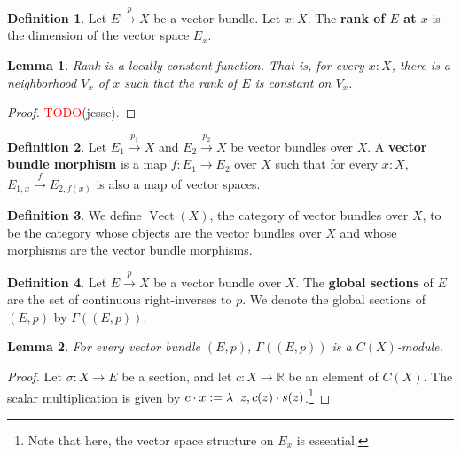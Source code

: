 \documentclass[11pt]{article}
\newcommand{\R}{\mathbb{R}}
\newcommand{\remph}[1]{\textcolor{red}{#1}}
\newcommand{\TODO}{\remph{TODO}}
\newcommand{\Vect}{\operatorname{Vect}}
\theoremstyle{plain}
\newtheorem{lemma}{Lemma}[section]
\theoremstyle{definition}
\newtheorem{definition}{Definition}[section]
\begin{document}
\begin{definition}\label{def:rank}
  Let \(E \overset{p}{\to} X\) be a vector bundle. Let \(x : X\). The \textbf{rank of \(E\) at \(x\)} is the dimension of the vector space \(E_x\).
\end{definition}

\begin{lemma}\label{lemma:rank-locally-constant}
  Rank is a locally constant function. That is, for every \(x : X\), there is a neighborhood \(V_{x}\) of \(x\) such that the rank of \(E\) is constant on \(V_x\).
\end{lemma}

\begin{proof}
  \TODO(jesse).
\end{proof}

\begin{definition} \label{def:vector-bundle-homomorphism}
  Let \(E_1 \overset{p_1}{\to} X\) and \(E_2 \overset{p_2}{\to} X\) be vector bundles over \(X\).
  A \textbf{vector bundle morphism} is a map \(f : E_1 \to E_2\) over \(X\) such that for every \(x : X\), \(E_{1,x} \overset{f}{\to} E_{2,f(x)}\) is also a map of vector spaces.
\end{definition}

\begin{definition} \label{def:category-vector-bundles}
  We define \(\Vect(X)\), the category of vector bundles over \(X\), to be the category whose objects are the vector bundles over \(X\) and whose morphisms are the vector bundle morphisms.
\end{definition}

\begin{definition}\label{def:global-sections}
  Let \(E \overset{p}{\to} X\) be a vector bundle over \(X\). The \textbf{global sections} of \(E\) are the set of continuous right-inverses to \(p\). We denote the global sections of \((E,p)\) by \(\Gamma((E,p))\).  
\end{definition}

\begin{lemma}\label{lemma:global-sections-module}
  For every vector bundle \((E,p)\), \(\Gamma((E,p))\) is a \(C(X)\)-module.
\end{lemma}
\begin{proof}
  Let \(\sigma : X \to E\) be a section, and let \(c : X \to \R\) be an element of \(C(X)\). The scalar multiplication is given by \(c \cdot x := \lambda \hspace{2mm} z, c(z) \cdot s(z)\).\footnote{Note that here, the vector space structure on \(E_x\) is essential.}
\end{proof}
\end{document}

